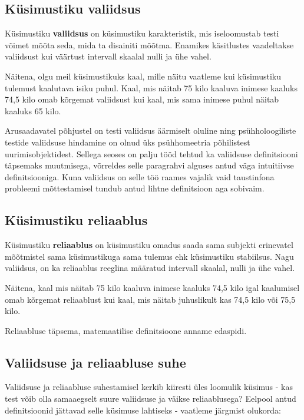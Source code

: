 \documentclass[a4paper,12pt,oneside]{article}
\numberwithin{equation}{section}
\theoremstyle{definition}
\begin{document}
\subsection{Küsimustiku valiidsus}

Küsimustiku \textbf{valiidsus} on küsimustiku karakteristik, mis iseloomustab testi võimet mõõta seda, mida ta disainiti mõõtma. Enamikes käsitlustes vaadeltakse valiidsust kui väärtust intervall skaalal nulli ja ühe vahel.

Näitena, olgu meil küsimustikuks kaal, mille näitu vaatleme kui küsimustiku tulemust kaalutava isiku puhul. Kaal, mis näitab 75 kilo kaaluva inimese kaaluks 74,5 kilo omab kõrgemat valiidsust kui kaal, mis sama inimese puhul näitab kaaluks 65 kilo.   

Arusaadavatel põhjustel on testi valiidsus äärmiselt oluline ning psühholoogiliste testide valiidsuse hindamine on olnud üks psühhomeetria põhilistest uurimisobjektidest. Sellega seoses on palju tööd tehtud ka valiidsuse definitsiooni täpsemaks muutmisega, võrreldes selle paragrahvi alguses antud väga intuitiivse definitsiooniga. Kuna valiidsus on selle töö raames vajalik vaid taustinfona probleemi mõttestamisel tundub antud lihtne definitsioon aga sobivaim. 

\subsection{Küsimustiku reliaablus}

Küsimustiku \textbf{reliaablus} on küsimustiku omadus saada sama subjekti erinevatel mõõtmistel sama küsimustikuga sama tulemus ehk küsimustiku stabiilsus. Nagu valiidsus, on ka reliaablus reeglina määratud intervall skaalal, nulli ja ühe vahel. 

Näitena, kaal mis näitab 75 kilo kaaluva inimese kaaluks 74,5 kilo igal kaalumisel omab kõrgemat reliaablust kui kaal, mis näitab juhuslikult kas 74,5 kilo või 75,5 kilo. 

Reliaabluse täpsema, matemaatilise definitsioone anname edaspidi. 

\subsection{Valiidsuse ja reliaabluse suhe}

Valiidsuse ja reliaabluse suhestamisel kerkib kiiresti üles loomulik küsimus - kas test võib olla samaaegselt suure valiidsuse ja väikse reliaablusega? Eelpool antud definitsioonid jättavad selle küsimuse lahtiseks - vaatleme järgmist olukorda:
\end{document}
